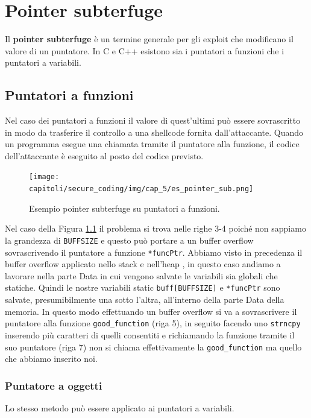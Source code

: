 \chapter{Pointer subterfuge}

Il \textbf{pointer subterfuge} è un termine generale per gli exploit che modificano
il valore di un puntatore. In C e C++ esistono sia i puntatori a funzioni che i
puntatori a variabili.

\section{Puntatori a funzioni}

Nel caso dei puntatori a funzioni il valore di quest'ultimi può essere sovrascritto
in modo da trasferire il controllo a una shellcode fornita dall'attaccante.
Quando un programma esegue una  chiamata tramite il puntatore alla funzione, il codice
dell'attaccante è eseguito al posto del codice previsto.

\begin{figure}[H]
	\centering
	\texttt{[image: capitoli/secure\_coding/img/cap\_5/es\_pointer\_sub.png]}
	\caption{Esempio pointer subterfuge su puntatori a funzioni.}\label{fig:es_poin_sub}
\end{figure}

Nel caso della Figura \ref{fig:es_poin_sub} il problema si trova nelle righe 3-4 poiché
non sappiamo la grandezza di \verb|BUFFSIZE| e questo può portare a un buffer overflow
sovrascrivendo il puntatore a funzione \verb|*funcPtr|. Abbiamo visto in precedenza
il buffer overflow applicato nello stack e nell'heap , in questo caso andiamo a
lavorare nella parte Data in cui vengono salvate le variabili sia globali che statiche.
Quindi le nostre variabili static \verb|buff[BUFFSIZE]| e \verb|*funcPtr| sono salvate,
presumibilmente una sotto l'altra, all'interno della parte Data della memoria.
In questo modo effettuando un buffer overflow si va a sovrascrivere il puntatore alla
funzione \verb|good_function| (riga 5), in seguito facendo uno \verb|strncpy| inserendo
più caratteri di quelli consentiti e richiamando la funzione tramite il suo
puntatore (riga 7) non si chiama effettivamente la \verb|good_function| ma
quello che abbiamo inserito noi.

\subsection{Puntatore a oggetti}

Lo stesso metodo può essere applicato ai puntatori a variabili.

